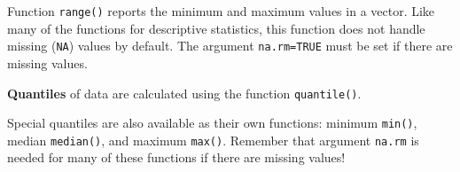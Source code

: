 \documentclass[
  13,
  letterpaper,
]{report}
\newenvironment{Shaded}{\begin{snugshade}}{\end{snugshade}}
\newcommand{\AttributeTok}[1]{\textcolor[rgb]{0.40,0.45,0.13}{#1}}
\newcommand{\CommentTok}[1]{\textcolor[rgb]{0.37,0.37,0.37}{#1}}
\newcommand{\ConstantTok}[1]{\textcolor[rgb]{0.56,0.35,0.01}{#1}}
\newcommand{\DecValTok}[1]{\textcolor[rgb]{0.68,0.00,0.00}{#1}}
\newcommand{\DocumentationTok}[1]{\textcolor[rgb]{0.37,0.37,0.37}{\textit{#1}}}
\newcommand{\FunctionTok}[1]{\textcolor[rgb]{0.28,0.35,0.67}{#1}}
\newcommand{\NormalTok}[1]{\textcolor[rgb]{0.00,0.23,0.31}{#1}}
\newcommand{\OtherTok}[1]{\textcolor[rgb]{0.00,0.23,0.31}{#1}}
\newcommand{\SpecialCharTok}[1]{\textcolor[rgb]{0.37,0.37,0.37}{#1}}
\begin{document}
Function \texttt{range()} reports the minimum and maximum values in a
vector. Like many of the functions for descriptive statistics, this
function does not handle missing (\texttt{NA}) values by default. The
argument \texttt{na.rm=TRUE} must be set if there are missing values.

\begin{Shaded}
\end{Shaded}

\textbf{Quantiles} of data are calculated using the function
\texttt{quantile()}.

Special quantiles are also available as their own functions: minimum
\texttt{min()}, median \texttt{median()}, and maximum \texttt{max()}.
Remember that argument \texttt{na.rm} is needed for many of these
functions if there are missing values!
\end{document}
